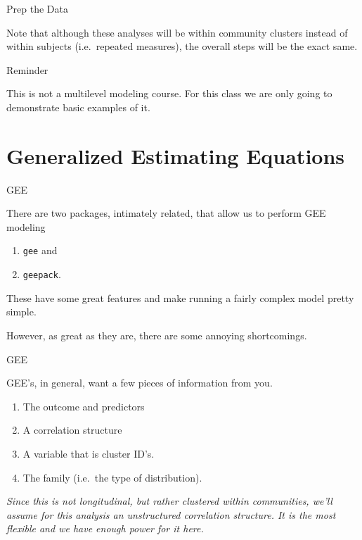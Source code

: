 \begin{frame}{Prep the Data}

\large

Note that although these analyses will be within community clusters
instead of within subjects (i.e.~repeated measures), the overall steps
will be the exact same.

\end{frame}

\begin{frame}{Reminder}

\large

This is not a multilevel modeling course. For this class we are only
going to demonstrate basic examples of it.

\end{frame}

\section{Generalized Estimating
Equations}\label{generalized-estimating-equations}

\begin{frame}[fragile]{GEE}

There are two packages, intimately related, that allow us to perform GEE
modeling

\begin{enumerate}
\def\labelenumi{\arabic{enumi}.}
\tightlist
\item
  \texttt{gee} and
\item
  \texttt{geepack}.
\end{enumerate}

These have some great features and make running a fairly complex model
pretty simple.

However, as great as they are, there are some annoying shortcomings.

\end{frame}

\begin{frame}{GEE}

GEE's, in general, want a few pieces of information from you.

\begin{enumerate}
\def\labelenumi{\arabic{enumi}.}
\tightlist
\item
  The outcome and predictors
\item
  A correlation structure
\item
  A variable that is cluster ID's.
\item
  The family (i.e.~the type of distribution).
\end{enumerate}

\emph{Since this is not longitudinal, but rather clustered within
communities, we'll assume for this analysis an unstructured correlation
structure. It is the most flexible and we have enough power for it
here.}

\end{frame}

